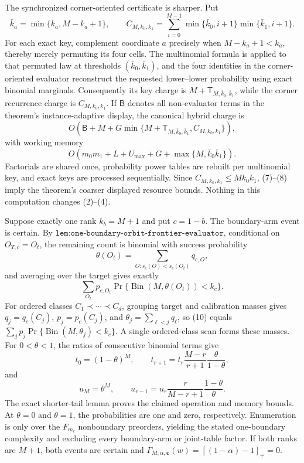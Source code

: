 The synchronized corner-oriented certificate is sharper. Put
\[
\bar k_a=\min\{k_a,M-k_a+1\},\qquad
C_{M,k_0,k_1}=\sum_{i=0}^{M-1}\min\{\bar k_0,i+1\}\min\{\bar k_1,i+1\}.
\tag{6}
\]
For each exact key, complement coordinate \(a\) precisely when \(M-k_a+1<k_a\), thereby merely permuting its four cells. The multinomial formula is applied to that permuted law at thresholds \((\bar k_0,\bar k_1)\), and the four identities in the corner-oriented evaluator reconstruct the requested lower--lower probability using exact binomial marginals. Consequently its key charge is \(M+\mathsf T_{M,\bar k_0,\bar k_1}\), while the corner recurrence charge is \(C_{M,k_0,k_1}\). If \(\mathsf B\) denotes all non-evaluator terms in the theorem's instance-adaptive display, the canonical hybrid charge is
\[
O\!\left(\mathsf B+M+G\min\{M+\mathsf T_{M,\bar k_0,\bar k_1},C_{M,k_0,k_1}\}\right),
\tag{7}
\]
with working memory
\[
O\!\left(m_0m_1+L+U_{\max}+G+\max\{M,\bar k_0\bar k_1\}\right).
\tag{8}
\]
Factorials are shared once, probability power tables are rebuilt per multinomial key, and exact keys are processed sequentially. Since \(C_{M,k_0,k_1}\le Mk_0k_1\), (7)--(8) imply the theorem's coarser displayed resource bounds. Nothing in this computation changes (2)--(4).

Suppose exactly one rank \(k_b=M+1\) and put \(c=1-b\). The boundary-arm event is certain. By \(\texttt{lem:one-boundary-orbit-frontier-evaluator}\), conditional on \(O_{T,c}=O_t\), the remaining count is binomial with success probability
\[
\theta(O_t)=\sum_{O:s_c(O)<s_c(O_t)}q_{c,O},
\tag{9}
\]
and averaging over the target gives exactly
\[
\sum_{O_t}p_{c,O_t}\Pr\{\operatorname{Bin}(M,\theta(O_t))<k_c\}.
\tag{10}
\]
For ordered classes \(C_1\prec\cdots\prec C_d\), grouping target and calibration masses gives \(q_j=q_c(C_j)\), \(p_j=p_c(C_j)\), and \(\theta_j=\sum_{\ell<j}q_\ell\), so (10) equals \(\sum_jp_j\Pr\{\operatorname{Bin}(M,\theta_j)<k_c\}\). A single ordered-class scan forms these masses. For \(0<\theta<1\), the ratios of consecutive binomial terms give
\[
t_0=(1-\theta)^M,\qquad t_{r+1}=t_r\frac{M-r}{r+1}\frac{\theta}{1-\theta},
\tag{11}
\]
and
\[
u_M=\theta^M,\qquad u_{r-1}=u_r\frac{r}{M-r+1}\frac{1-\theta}{\theta}.
\tag{12}
\]
The exact shorter-tail lemma proves the claimed operation and memory bounds. At \(\theta=0\) and \(\theta=1\), the probabilities are one and zero, respectively. Enumeration is only over the \(F_{m_c}\) nonboundary preorders, yielding the stated one-boundary complexity and excluding every boundary-arm or joint-table factor. If both ranks are \(M+1\), both events are certain and \(\Gamma_{M,\alpha,\boldsymbol\varepsilon}(w)=[(1-\alpha)-1]_+=0\).

